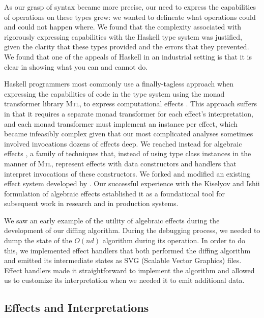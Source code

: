 \documentclass[acmsmall,fleqn,12pt]{acmart}
\begin{document}
As our grasp of syntax became more precise, our need to express the
capabilities of operations on these types grew: we wanted to delineate what
operations could and could not happen where. We found that the complexity
associated with rigorously expressing capabilities with the Haskell type system
was justified, given the clarity that these types provided and the errors that
they prevented. We found that one of the appeals of Haskell in an industrial
setting is that it is clear in showing what you can and cannot do.

\newcommand{\mtl}{\textsc{Mtl}}

Haskell programmers most commonly use a finally-tagless approach
\cite{Carette07finallytagless} when expressing
the capabilities of code in the type system using the monad transformer library
\mtl{}, to express computational effects \cite{Jones95Functional}. This approach
suffers in that it requires a separate monad transformer for each effect’s
interpretation, and each monad transformer must implement an instance per
effect, which became infeasibly complex given that our most complicated analyses
sometimes involved invocations dozens of effects deep. We reached instead for
algebraic effects \cite{Plotkin01Semantics}, a family of techniques that,
instead of using type class instances in the manner of \mtl{}, represent effects
with data constructors and handlers that interpret invocations of these
constructors. We forked and modified an existing effect system developed by
\citet{freersimple16}. Our successful experience with the Kiselyov and Ishii
formulation of algebraic effects established it as a foundational tool for
subsequent work in research and in production systems.

We saw an early example of the utility of algebraic effects during the
development of our diffing algorithm. During the debugging process, we needed to
dump the state of the $O(nd)$ algorithm during its operation. In order to do
this, we implemented effect handlers that both performed the diffing algorithm
and emitted its intermediate states as SVG (Scalable Vector Graphics) files.
Effect handlers made it straightforward to implement the algorithm and allowed
us to customize its interpretation when we needed it to emit additional data.

\subsection{Effects and Interpretations} \label{sec:eff}
\end{document}
